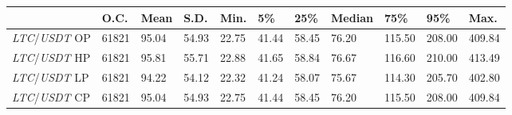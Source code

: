 \begin{tabular}{lllllllllll}
\toprule
 & \textbf{O.C.} & \textbf{Mean} & \textbf{S.D.} & \textbf{Min.} & \textbf{5\%} & \textbf{25\%} & \textbf{Median} & \textbf{75\%} & \textbf{95\%} & \textbf{Max.} \\
\midrule
\emph{LTC}/\emph{USDT} OP & 61821 & 95.04 & 54.93 & 22.75 & 41.44 & 58.45 & 76.20 & 115.50 & 208.00 & 409.84 \\
\emph{LTC}/\emph{USDT} HP & 61821 & 95.81 & 55.71 & 22.88 & 41.65 & 58.84 & 76.67 & 116.60 & 210.00 & 413.49 \\
\emph{LTC}/\emph{USDT} LP & 61821 & 94.22 & 54.12 & 22.32 & 41.24 & 58.07 & 75.67 & 114.30 & 205.70 & 402.80 \\
\emph{LTC}/\emph{USDT} CP & 61821 & 95.04 & 54.93 & 22.75 & 41.44 & 58.45 & 76.20 & 115.50 & 208.00 & 409.84 \\
\bottomrule
\end{tabular}
